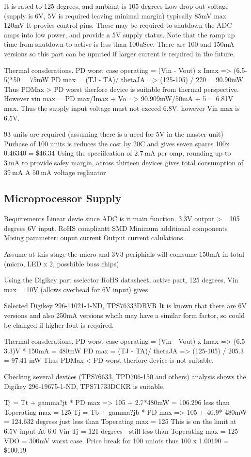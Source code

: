 It is rated to 125 degrees, and ambiant is 105 degrees
Low drop out voltage (supply is  6V, 5V is required leaving minimal margin) typically 85mV max 120mV
It provies control pins. These may be required to shutdown the ADC amps into low power, and provide a 5V supply status.
Note that the ramp up time from shutdown to active is less than 100uSec.
There are 100 and 150mA versions so this part can be uprated if larger current is required in the future.

Thermal consderations.
PD worst case operating = (Vin - Vout) x Imax => (6.5-5)*50 = 75mW
PD max = (TJ - TA)/ thetaJA => (125-105) / 220 = 90.90mW
Thus PDMax > PD worst therfore device is suitable from thermal perspective.
However vin max = PD max/Imax + Vo => 90.909mW/50mA + 5 = 6.81V max.
Thus the supply input voltage must not exceed 6.8V, however Vin max is 6.5V.

93 units are required (assuming there is a need for 5V in the master unit)
Purhase of 100 units is reduces the cost by 20C and gives seven spares
100x 0.46340 = \$46.34
Using the speciifcation of $\SI{2.7}{\milli\ampere}$ per omp, rounding up to $\SI{3}{\milli\ampere}$ to provide safey margin, across thirteen devices gives total consumption of $\SI{39}{\milli\ampere}$ 
A $\SI{50}{\milli\ampere}$ voltage regliuator

\subsection{Microprocessor Supply}
Requirements
Linear devie since ADC is it main function.
3.3V output
>= 105 degrees
6V input.
RoHS compliantt
SMD
Minimum additional components
Mising parameter: ouput current
Output current calulations

Assume at this stage the micro and 3V3 periphials will comsume 150mA in total (micro, LED x 2, possbible buss chips)

Using the Digikey part sselector 
RoHS datasheet, active part, 125 degrees, Vin max = 10V (allows overhead for 6V input) gives 

Selected Digikey 296-11021-1-ND, TPS76333DBVR
It is known that there are 6V versions and also 250mA versions whcih may have a similar form factor, so could be changed if higher Iout is required.

Thermal consderations.
PD worst case operating = (Vin - Vout) x Imax => (6.5-3.3)V * 150mA = 480mW
PD max = (TJ - TA)/ thetaJA => (125-105) / 205.3 = 97.41 mW
Thus PDMax < PD worst therfore device is not suitable.

Checking several devices (TPS76633, TPD706-150 and others) analysis shows the Digikey 296-19675-1-ND, TPS71733DCKR is suitable.

Tj = Tt + gamma?jt * PD max => 105 + 2.7*480mW = 106.296 less than Toperating max = 125 
Tj = Tb + gamma?jb * PD max => 105 + 40.9* 480mW = 124.632 degress just less than Toperating max = 125 
This is on the limit at 6.5V input 
At 6.0 Vin Tj = 121 degrees - still less than Toperating max = 125 
VDO = 300mV worst case.
Price break for 100 uniots thus 100 x 1.00190 =  \$100.19 